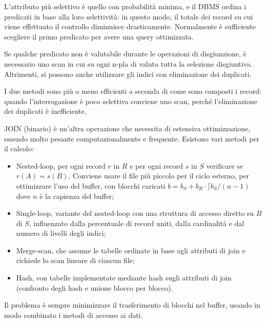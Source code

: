 L'attributo più selettivo è quello con probabilità minima, e il DBMS ordina i predicati in base alla loro selettività: in questo modo, il totale dei record su cui viene effettuato il controllo diminuisce drasticamente. Normalmente è sufficiente scegliere il primo predicato per avere una query ottimizzata. 

Se qualche predicato non è valutabile durante le operazioni di disgiunzione, è necessario uno scan in cui su ogni n-pla di valuta tutta la selezione disgiuntiva. Altrimenti, si possono anche utilizzare gli indici con eliminazione dei duplicati. 

I due metodi sono più o meno efficienti a seconda di come sono composti i record: quando l'interrogazione è poco selettiva conviene uno scan, perché l'eliminazione dei duplicati è inefficiente.

JOIN (binario) è un'altra operazione che necessita di estensiva ottimizzazione, essendo molto pesante computazionalmente e frequente. Esistono vari metodi per il calcolo:
\begin{itemize}
	\item Nested-loop, per ogni record $r$ in $R$ e per ogni record $s$ in $S$ verificare se $r(A) = s(B)$. Conviene usare il file più piccolo per il ciclo esterno, per ottimizzare l'uso del buffer, con blocchi caricati $b = b_ S + b_R \cdot \lceil b_S / (n - 1)$ dove $n$ è la capienza del buffer;
	\item Single-loop, variante del nested-loop con una struttura di accesso diretto su $B$ di $S$, influenzato dalla percentuale di record uniti, dalla cardinalità e dal numero di livelli degli indici;
	\item Merge-scan, che assume le tabelle ordinate in base agli attributi di join e richiede lo scan lineare di ciascun file;
	\item Hash, con tabelle implementate mediante hash sugli attributi di join (confronto degli hash e unione blocco per blocco).
\end{itemize}

Il problema è sempre minimizzare il trasferimento di blocchi nel buffer, usando in modo combinato i metodi di accesso ai dati.
